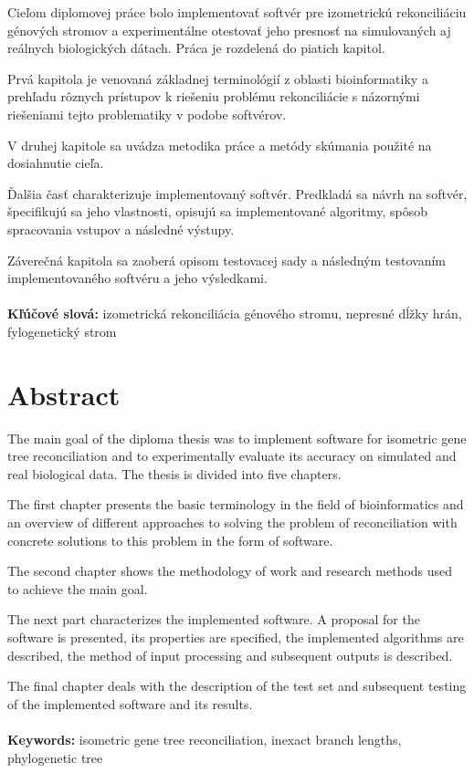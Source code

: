 \documentclass[12pt,a4paper,oneside]{book}
\begin{document}
Cieľom diplomovej práce bolo implementovať softvér pre izometrickú rekonciliáciu génových stromov a experimentálne otestovať jeho presnosť na simulovaných aj reálnych biologických dátach. Práca je rozdelená do piatich kapitol.

Prvá kapitola je venovaná základnej terminológií z oblasti bioinformatiky a prehľadu rôznych prístupov k riešeniu problému rekonciliácie s názornými riešeniami tejto problematiky v podobe softvérov.

V druhej kapitole sa uvádza metodika práce a metódy skúmania použité na dosiahnutie cieľa.

Ďalšia časť charakterizuje implementovaný softvér. Predkladá sa návrh na softvér, špecifikujú sa jeho vlastnosti, opisujú sa implementované algoritmy, spôsob spracovania vstupov a následné výstupy.

Záverečná kapitola sa zaoberá opisom testovacej sady a následným testovaním implementovaného softvéru a jeho výsledkami.
\\\\
\textbf{Kľúčové slová:} izometrická rekonciliácia génového stromu, nepresné dĺžky hrán, fylogenetický strom
\vfill\eject 

\chapter*{Abstract}

The main goal of the diploma thesis was to implement software for isometric gene tree reconciliation and to experimentally evaluate its accuracy on simulated and real biological data. The thesis is divided into five chapters.

The first chapter presents the basic terminology in the field of bioinformatics and an overview of different approaches to solving the problem of reconciliation with concrete solutions to this problem in the form of software.

The second chapter shows the methodology of work and research methods used to achieve the main goal.

The next part characterizes the implemented software. A proposal for the software is presented, its properties are specified, the implemented algorithms are described, the method of input processing and subsequent outputs is described.

The final chapter deals with the description of the test set and subsequent testing of the implemented software and its results.
\\\\
\textbf{Keywords:} isometric gene tree  reconciliation, inexact branch lengths, phylogenetic tree
\vfill\eject  
\end{document}
